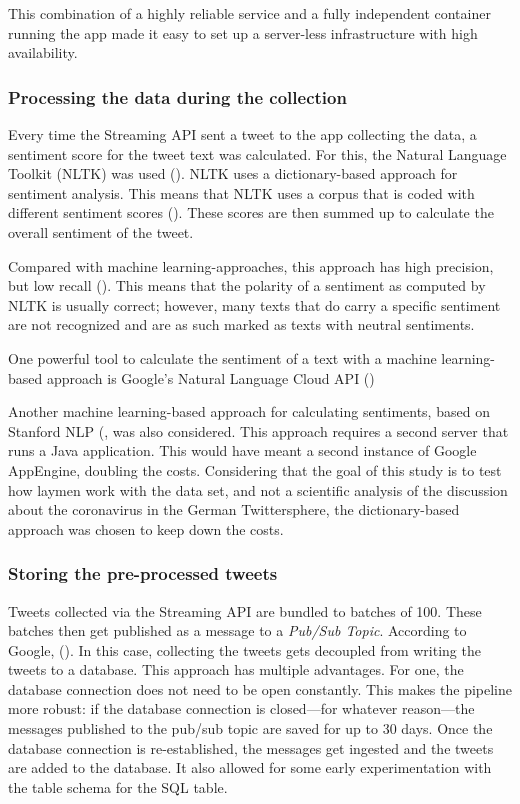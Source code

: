 This combination of a highly reliable service and a fully independent container running the app made it easy to set up a server-less infrastructure with high availability.

\subsubsection{Processing the data during the collection}
Every time the Streaming API sent a tweet to the app collecting the data, a sentiment score for the tweet text was calculated. For this, the Natural Language Toolkit (NLTK) was used (\cite{loper2002nltk}). NLTK uses a dictionary-based approach for sentiment analysis. This means that NLTK uses a corpus that is coded with different sentiment scores (\cite{haselmayer2017sentiment}). These scores are then summed up to calculate the overall sentiment of the tweet.

Compared with machine learning-approaches, this approach has high precision, but low recall (\cite{sorokaBadNewsMad2015}). This means that the polarity of a sentiment as computed by NLTK is usually correct; however, many texts that do carry a specific sentiment are not recognized and are as such marked as texts with neutral sentiments.

One powerful tool to calculate the sentiment of a text with a machine learning-based approach is Google's Natural Language Cloud API (\cite{googleSentimentAnalysisTutorial})

Another machine learning-based approach for calculating sentiments, based on Stanford NLP (\cite{stanfordnaturallanguageprocessinggroupSoftwareStanfordNatural}, was also considered. This approach requires a second server that runs a Java application. This would have meant a second instance of Google AppEngine, doubling the costs. Considering that the goal of this study is to test how laymen work with the data set, and not a scientific analysis of the discussion about the coronavirus in the German Twittersphere, the dictionary-based approach was chosen to keep down the costs.

\subsubsection{Storing the pre-processed tweets}
Tweets collected via the Streaming API are bundled to batches of 100. These batches then get published as a message to a \emph{Pub/Sub Topic}. According to Google,  (\cite{googleWhatPubSub2020}). In this case, collecting the tweets gets decoupled from writing the tweets to a database. This approach has multiple advantages. For one, the database connection does not need to be open constantly. This makes the pipeline more robust: if the database connection is closed---for whatever reason---the messages published to the pub/sub topic are saved for up to 30 days. Once the database connection is re-established, the messages get ingested and the tweets are added to the database. It also allowed for some early experimentation with the table schema for the SQL table.

